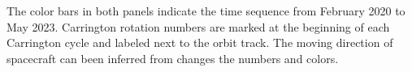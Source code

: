 The color bars in both panels indicate the time sequence from February 2020 to May 2023. Carrington rotation numbers are marked at the beginning of each Carrington cycle and labeled next to the orbit track. The moving direction of spacecraft can been inferred from changes the numbers and colors.






